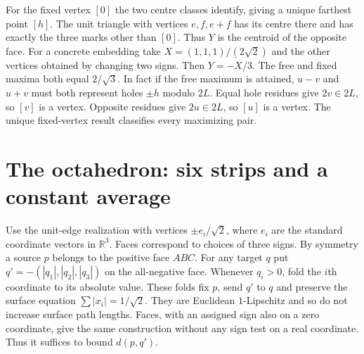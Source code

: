 For the fixed vertex $[0]$ the two centre classes identify, giving a unique farthest point $[h]$. The unit triangle with vertices $e,f,e+f$ has its centre there and has exactly the three marks other than $[0]$. Thus $Y$ is the centroid of the opposite face. For a concrete embedding take $X=(1,1,1)/(2\sqrt2)$ and the other vertices obtained by changing two signs. Then $Y=-X/3$. The free and fixed maxima both equal $2/\sqrt3$. In fact if the free maximum is attained, $u-v$ and $u+v$ must both represent holes $\pm h$ modulo $2L$. Equal hole residues give $2v\in 2L$, so $[v]$ is a vertex. Opposite residues give $2u\in2L$, so $[u]$ is a vertex. The unique fixed-vertex result classifies every maximizing pair.

\section{The octahedron: six strips and a constant average}
Use the unit-edge realization with vertices $\pm e_i/\sqrt2$, where $e_i$ are the standard coordinate vectors in $\mathbb R^3$. Faces correspond to choices of three signs. By symmetry a source $p$ belongs to the positive face $ABC$. For any target $q$ put $q'=-(|q_1|,|q_2|,|q_3|)$ on the all-negative face. Whenever $q_i>0$, fold the $i$th coordinate to its absolute value. These folds fix $p$, send $q'$ to $q$ and preserve the surface equation $\sum |x_i|=1/\sqrt2$. They are Euclidean $1$-Lipschitz and so do not increase surface path lengths. Faces, with an assigned sign also on a zero coordinate, give the same construction without any sign test on a real coordinate. Thus it suffices to bound $d(p,q')$.

